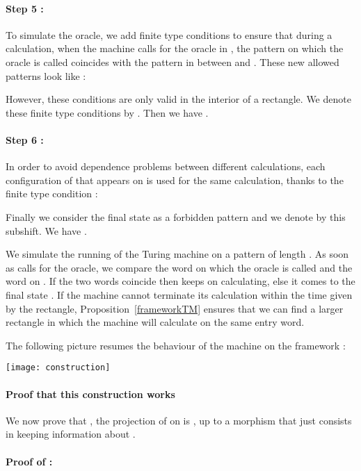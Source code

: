 \documentclass[proceedings]{stacs}
\theoremstyle{plain}\newtheorem{satz}[thm]{Satz}
\theoremstyle{definition}\newtheorem{crucial}[thm]{Crucial Definition}
\begin{document}
\paragraph{Step 5 :} To simulate the oracle, we add finite type conditions to ensure that during a calculation, when the machine calls for the oracle in , the pattern  on which the oracle is called coincides with the pattern in  between  and . These new allowed patterns look like :

However, these conditions are only valid in the interior of a rectangle. We denote these finite type conditions by . Then we have .

\paragraph{Step 6 :} In order to avoid dependence problems between different calculations, each configuration of  that appears on  is used for the same calculation, thanks to the finite type condition :

Finally we consider the final state  as a forbidden pattern and we denote by  this subshift. We have .

We simulate the running of the Turing machine  on a pattern  of length . As soon as  calls for the oracle, we compare the word on which the oracle is called and the word on . If the two words coincide then  keeps on calculating, else it comes to the final state . If the machine cannot terminate its calculation within the time given by the rectangle, Proposition~\ref{frameworkTM} ensures that we can find a larger rectangle in which the machine will calculate on the same entry word.

\vspace{0,4cm}
The following picture resumes the behaviour of the machine  on the framework :

\begin{center}
\texttt{[image: construction]}
\end{center}

\paragraph{\textbf{Proof that this construction works}}
We now prove that , the projection of  on  is , up to a morphism that just consists in keeping information about .


\paragraph{Proof of :}
\end{document}
